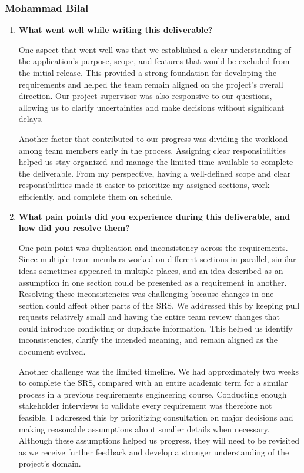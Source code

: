 \documentclass[10pt]{article}
\begin{document}
\subsubsection*{Mohammad Bilal}

\begin{enumerate}
    \item \textbf{What went well while writing this deliverable?}

    One aspect that went well was that we established a clear understanding
    of the application's purpose, scope, and features that would be excluded
    from the initial release. This provided a strong foundation for developing
    the requirements and helped the team remain aligned on the project's
    overall direction. Our project supervisor was also responsive to our
    questions, allowing us to clarify uncertainties and make decisions without
    significant delays.

    Another factor that contributed to our progress was dividing the workload
    among team members early in the process. Assigning clear responsibilities
    helped us stay organized and manage the limited time available to complete
    the deliverable. From my perspective, having a well-defined scope and clear
    responsibilities made it easier to prioritize my assigned sections, work
    efficiently, and complete them on schedule.

    \item \textbf{What pain points did you experience during this
    deliverable, and how did you resolve them?}

    One pain point was duplication and inconsistency across the
    requirements. Since multiple team members worked on different
    sections in parallel, similar ideas sometimes appeared in multiple
    places, and an idea described as an assumption in one section
    could be presented as a requirement in another. Resolving these
    inconsistencies was challenging because changes in one section
    could affect other parts of the SRS. We addressed this by keeping
    pull requests relatively small and
    having the entire team review changes that could introduce
    conflicting or duplicate information. This helped us identify
    inconsistencies, clarify the intended meaning, and remain aligned
    as the document evolved.

    Another challenge was the limited timeline. We had approximately
    two weeks to complete the SRS, compared with an entire academic
    term for a similar process in a previous requirements engineering
    course. Conducting enough stakeholder interviews to validate
    every requirement was therefore not feasible. I addressed this
    by prioritizing consultation on major decisions and making
    reasonable assumptions about smaller details when necessary.
    Although these assumptions helped us progress, they will need
    to be revisited as we receive further feedback and develop a
    stronger understanding of the project's domain.


\end{enumerate}
\end{document}
